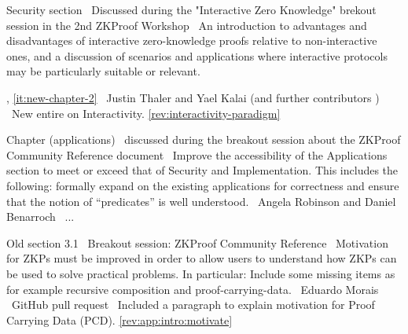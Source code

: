 Security section
\newcol \ccontext\ Discussed during the "Interactive Zero Knowledge" brekout session in the 2nd ZKProof Workshop
				\propContrib\ An introduction to advantages and disadvantages of interactive zero-knowledge proofs relative to non-interactive ones, and a discussion of scenarios and applications where interactive protocols may be particularly suitable or relevant.
				
\newcol {}, \ref{it:new-chapter-2}
\newcol \contributors\ Justin Thaler and Yael Kalai (and further contributors )
				\Chan\ New entire  on Interactivity.
\newcol \ref{rev:interactivity-paradigm}
\rowendL
\myendIssue




Chapter (applications)
\newcol \ccontext\ discussed during the breakout session about the ZKProof Community Reference document
				\propContrib\ Improve the accessibility of the Applications section to meet or exceed that of Security and Implementation. This includes the following: formally expand on the existing applications for correctness and ensure that the notion of ``predicates'' is well understood.
\newcol {}
\newcol \contributors\ Angela Robinson and Daniel Benarroch
				\Chan\ ...
\newcol %
\rowendL
\myendIssue




Old section 3.1
\newcol \ccontext\ Breakout session: ZKProof Community Reference
				\propContrib\ Motivation for ZKPs must be improved in order to allow users to understand how ZKPs can be used to solve practical problems. In particular: Include some missing items as for example recursive composition and proof-carrying-data.
\newcol {}
\newcol \contributors\ Eduardo Morais
				\submit\ GitHub pull request
				\Chan\ Included a paragraph to explain motivation for Proof Carrying Data (PCD).	
\newcol \ref{rev:app:intro:motivate}
\rowendL
\myendIssue




